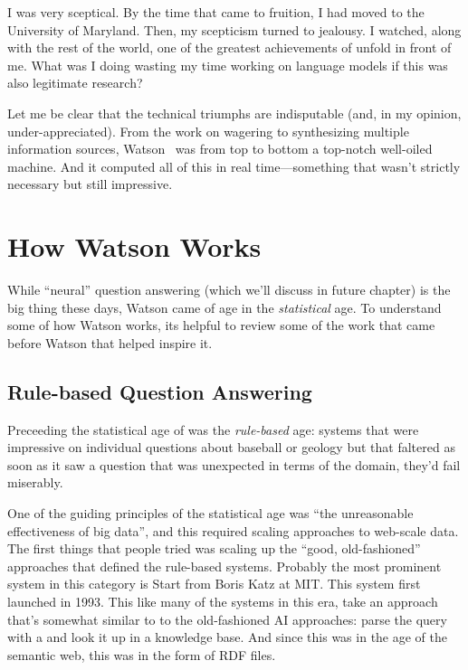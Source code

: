 I was very sceptical.
%
By the time that \watson{} came to fruition, I had moved to the
University of Maryland.
%
Then, my scepticism turned to jealousy.
%
I watched, along with the rest of the world, one of the greatest
achievements of  unfold in front of me.
%
What was I doing wasting my time working on language models if this was
also legitimate research?

Let me be clear that the technical triumphs are indisputable (and, in
my opinion, under-appreciated).
%
From the work on wagering to synthesizing multiple information sources,
Watson~\citep{ferruci-10} was from top to bottom a top-notch well-oiled
machine.
%
And it computed all of this in real time---something that wasn't
strictly necessary but still impressive.

\section{How Watson Works}

While ``neural'' question answering (which we'll discuss in future
chapter) is the big thing these days, Watson came of age in the
\emph{statistical} age.
%
To understand some of how Watson works, its helpful to review some of
the work that came before Watson that helped inspire it.

\subsection{Rule-based Question Answering}

Preceeding the statistical age of  was the \emph{rule-based}
age: systems that were impressive on individual questions about
baseball or geology but that faltered as soon as it saw a question
that was unexpected in terms of the domain, they'd fail miserably.

One of the guiding principles of the statistical age was ``the
unreasonable effectiveness of big data'', and this required scaling 
approaches to web-scale data.
%
The first things that people tried was scaling up the ``good,
old-fashioned'' approaches that defined the rule-based systems.
%
Probably the most prominent system in this category is Start from Boris Katz
at MIT.  This system first launched in 1993.  This like many of the systems in
this era, take an approach that’s somewhat similar to to the old-fashioned AI
approaches: parse the query with a and look it up in a knowledge base.  And
since this was in the age of the semantic web, this was in the form of RDF
files.

